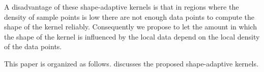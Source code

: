 A disadvantage of these shape-adaptive kernels is that in regions where the density of sample points is low there are not enough data points to compute the shape of the kernel reliably. Consequently we propose to let the amount in which the shape of the kernel is influenced by the local data depend on the local density of the data points.

This paper is organized as follows.  discusses the proposed shape-adaptive kernels. 